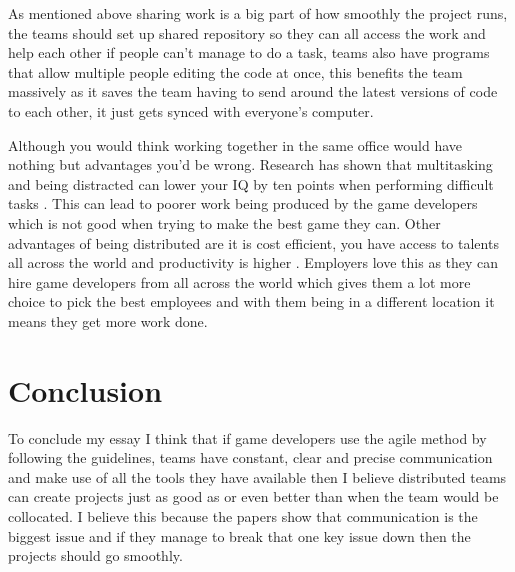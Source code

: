 \documentclass{scrartcl}
\begin{document}
As mentioned above sharing work is a big part of how smoothly the project runs, the teams should set up shared repository \cite{1609824} so they can all access the work and help each other if people can’t manage to do a task, teams also have programs that allow multiple people editing the code at once, this benefits the team massively as it saves the team having to send around the latest versions of code to each other, it just gets synced with everyone’s computer. \par
Although you would think working together in the same office would have nothing but advantages you’d be wrong. Research has shown that multitasking and being distracted can lower your IQ by ten points when performing difficult tasks \cite{matthews2011agile}. This can lead to poorer work being produced by the game developers which is not good when trying to make the best game they can. Other advantages of being distributed are it is cost efficient, you have access to talents all across the world and productivity is higher \cite{6634027}. Employers love this as they can hire game developers from all across the world which gives them a lot more choice to pick the best employees and with them being in a different location it means they get more work done.


\section{Conclusion}

To conclude my essay I think that if game developers use the agile method by following the guidelines, teams have constant, clear and precise communication and make use of all the tools they have available then I believe distributed teams can create projects just as good as or even better than when the team would be collocated. I believe this because the papers show that communication is the biggest issue and if they manage to break that one key issue down then the projects should go smoothly. 



\end{document}
